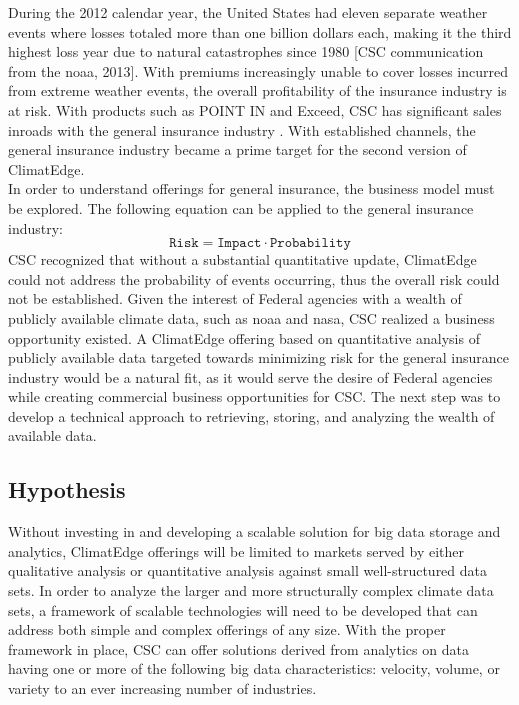 During the 2012 calendar year, the United States had eleven separate weather events where losses totaled more than one billion dollars each, making it the third highest loss year due to natural catastrophes since 1980 [\textsc{CSC} communication from the \gls{noaa}, 2013]. With premiums increasingly unable to cover losses incurred from extreme weather events, the overall profitability of the insurance industry is at risk. With products such as POINT IN and Exceed, \textsc{CSC} has significant sales inroads with the general insurance industry \cite{point_in} \cite{exceed}. With established channels, the general insurance industry became a prime target for the second version of ClimatEdge.\\

In order to understand offerings for general insurance, the business model must be explored. The following equation can be applied to the general insurance industry: 
\begin{equation*}
\texttt{Risk} = \texttt{Impact} \cdot \texttt{Probability}
\end{equation*}
\textsc{CSC} recognized that without a substantial quantitative update, ClimatEdge could not address the probability of events occurring, thus the overall risk could not be established. Given the interest of Federal agencies with a wealth of publicly available climate data, such as \gls{noaa} and \gls{nasa}, \textsc{CSC} realized a business opportunity existed. A ClimatEdge offering based on quantitative analysis of publicly available data targeted towards minimizing risk for the general insurance industry would be a natural fit, as it would serve the desire of Federal agencies while creating commercial business opportunities for \textsc{CSC}. The next step was to develop a technical approach to retrieving, storing, and analyzing the wealth of available data. 
\subsection{Hypothesis}
Without investing in and developing a scalable solution for big data  storage and analytics, ClimatEdge offerings will be limited to markets served by either qualitative analysis or quantitative analysis against small well-structured data sets. In order to analyze the larger and more structurally complex climate data sets, a framework of scalable technologies will need to be developed that can address both simple and complex offerings of any size. With the proper framework in place, \textsc{CSC} can offer solutions derived from analytics on data having one or more of the following big data characteristics: velocity, volume, or variety to an ever increasing number of industries.\\
 

